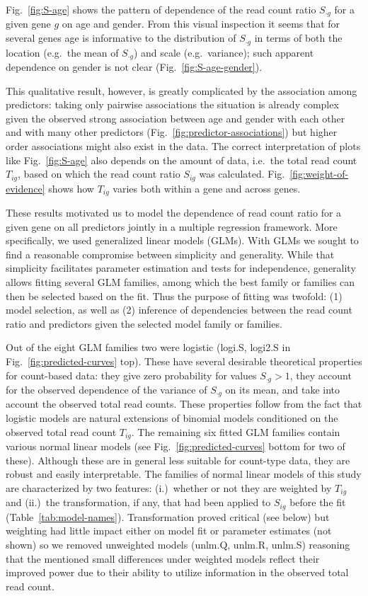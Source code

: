 \documentclass[letterpaper]{article}
\begin{document}
Fig.~\ref{fig:S-age} shows the pattern of dependence of
the read count ratio \(S_{\cdot g}\) for a given gene \(g\) on age and gender.  From
this visual inspection it seems that for several genes age is informative to
the distribution of \(S_{\cdot g}\) in terms of both the location (e.g.~the mean of
\(S_{\cdot g}\)) and scale (e.g.~variance); such apparent dependence on gender is not
clear (Fig.~\ref{fig:S-age-gender}).

This qualitative result, however, is greatly complicated by the association
among predictors: taking only pairwise associations the situation is already
complex given the observed strong association between age and gender with each
other and with many other predictors (Fig.~\ref{fig:predictor-associations})
but higher order associations might also exist in the data.
The correct interpretation of plots like Fig.~\ref{fig:S-age} also depends on
the amount of data, i.e.~the total read count \(T_{ig}\), based on which the
read count ratio \(S_{ig}\) was calculated.  Fig.~\ref{fig:weight-of-evidence}
shows how \(T_{ig}\) varies both within a gene and across genes.

These results motivated us to model the dependence of read count ratio for a
given gene on all predictors jointly in a multiple regression framework.  More
specifically, we used generalized linear models (GLMs).  With GLMs we sought
to find a reasonable compromise between simplicity and generality.  While that
simplicity facilitates parameter estimation and tests for independence,
generality allows fitting several GLM families, among which the best family or
families can then be selected based on the fit.  Thus the purpose of fitting
was twofold: (1) model selection, as well as (2) inference of dependencies
between the read count ratio and predictors given the selected model family or
families.

Out of the eight GLM families two were logistic (logi.S, logi2.S in
Fig.~\ref{fig:predicted-curves} top).  These have several desirable
theoretical properties for count-based data: they give zero probability for
values \(S_{\cdot g}>1\), they account for the observed dependence of the
variance of \(S_{\cdot g}\) on its mean, and take into account the observed
total read counts.  These properties follow from the fact that logistic models
are natural extensions of binomial models conditioned on the observed total
read count \(T_{ig}\).  The remaining six fitted GLM families contain various
normal linear models (see Fig.~\ref{fig:predicted-curves} bottom for two of
these).  Although these are in general less suitable for count-type data, they
are robust and easily interpretable. The families of normal linear models of
this study are characterized by two features: (i.)~whether or not they are
weighted by \(T_{ig}\) and (ii.)~the transformation, if any, that had been
applied to \(S_{ig}\) before the fit (Table~\ref{tab:model-names}).
Transformation proved critical (see below) but weighting had little impact
either on model fit or parameter estimates (not shown) so we removed
unweighted models (unlm.Q, unlm.R, unlm.S) reasoning that the mentioned small
differences under weighted models reflect their improved power due to their
ability to utilize information in the observed total read count.
\end{document}
